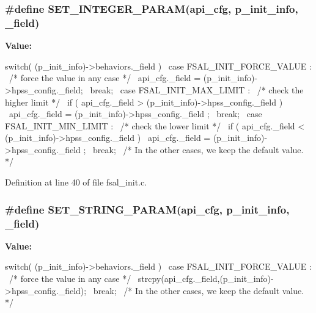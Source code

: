 \subsubsection[{SET\_\-INTEGER\_\-PARAM}]{\setlength{\rightskip}{0pt plus 5cm}\#define SET\_\-INTEGER\_\-PARAM(api\_\-cfg, \/  p\_\-init\_\-info, \/  \_\-field)}\label{fsal__init_8c_a802153fcb81fd9f7b272dbf6eb477aec}
{\bfseries Value:}
\begin{DoxyCode}
switch( (p_init_info)->behaviors._field ){                    \
    case FSAL_INIT_FORCE_VALUE :                                  \
        /* force the value in any case */                         \
        api_cfg._field = (p_init_info)->hpss_config._field;       \
        break;                                                \
    case FSAL_INIT_MAX_LIMIT :                                    \
      /* check the higher limit */                                \
      if ( api_cfg._field > (p_init_info)->hpss_config._field )   \
        api_cfg._field = (p_init_info)->hpss_config._field ;      \
        break;                                                \
    case FSAL_INIT_MIN_LIMIT :                                    \
      /* check the lower limit */                                 \
      if ( api_cfg._field < (p_init_info)->hpss_config._field )   \
        api_cfg._field = (p_init_info)->hpss_config._field ;      \
        break;                                                \
    /* In the other cases, we keep the default value. */          \
    }                                                             \
\end{DoxyCode}


Definition at line 40 of file fsal\_\-init.c.
\subsubsection[{SET\_\-STRING\_\-PARAM}]{\setlength{\rightskip}{0pt plus 5cm}\#define SET\_\-STRING\_\-PARAM(api\_\-cfg, \/  p\_\-init\_\-info, \/  \_\-field)}\label{fsal__init_8c_a7e81fe711a5c74c6137e9ee255672ff7}
{\bfseries Value:}
\begin{DoxyCode}
switch( (p_init_info)->behaviors._field ){                    \
    case FSAL_INIT_FORCE_VALUE :                                  \
      /* force the value in any case */                           \
      strcpy(api_cfg._field,(p_init_info)->hpss_config._field);   \
      break;                                                \
    /* In the other cases, we keep the default value. */          \
    }                                                             \
\end{DoxyCode}


